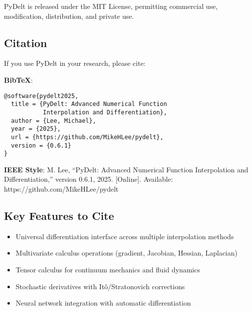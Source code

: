 \documentclass[10pt,journal,compsoc]{IEEEtran}
\begin{document}
PyDelt is released under the MIT License, permitting commercial use, modification, distribution, and private use.

\subsection*{Citation}

If you use PyDelt in your research, please cite:

\textbf{BibTeX}:
\begin{verbatim}
@software{pydelt2025,
  title = {PyDelt: Advanced Numerical Function 
           Interpolation and Differentiation},
  author = {Lee, Michael},
  year = {2025},
  url = {https://github.com/MikeHLee/pydelt},
  version = {0.6.1}
}
\end{verbatim}

\textbf{IEEE Style}: M. Lee, ``PyDelt: Advanced Numerical Function Interpolation and Differentiation,'' version 0.6.1, 2025. [Online]. Available: https://github.com/MikeHLee/pydelt

\subsection*{Key Features to Cite}

\begin{itemize}
    \item Universal differentiation interface across multiple interpolation methods
    \item Multivariate calculus operations (gradient, Jacobian, Hessian, Laplacian)
    \item Tensor calculus for continuum mechanics and fluid dynamics
    \item Stochastic derivatives with Itô/Stratonovich corrections
    \item Neural network integration with automatic differentiation
\end{itemize}
\end{document}
